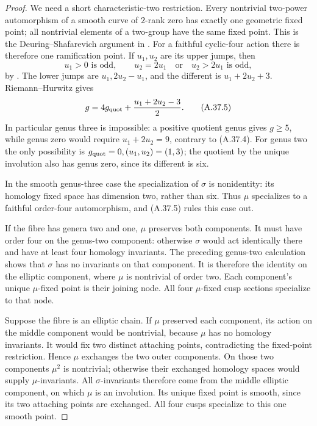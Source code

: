 \begin{proof}
We need a short characteristic-two restriction. Every
nontrivial two-power automorphism of a smooth curve of
\(2\)-rank zero has exactly one geometric fixed point;
all nontrivial elements of a two-group have the same
fixed point. This is the Deuring--Shafarevich argument in
\cite[Lemma 3.2 and Remark 3.1]{fghGiuliettiKorchmaros}.
For a faithful cyclic-four action there is therefore
one ramification point. If \(u_1,u_2\) are its upper
jumps, then
\[
 u_1>0\text{ is odd},\qquad
 u_2=2u_1\quad\text{or}\quad u_2>2u_1\text{ is odd},
                                                               \tag{A.37.4}
\]
by \cite[Theorem 1.1(c)]{fghObusPries}.
The lower jumps are \(u_1,2u_2-u_1\), and the different
is \(u_1+2u_2+3\). Riemann--Hurwitz gives
\[
      g=4g_{\rm quot}+\frac{u_1+2u_2-3}{2}.             \tag{A.37.5}
\]
In particular genus three is impossible: a positive quotient
genus gives \(g\ge5\), while genus zero would require
\(u_1+2u_2=9\), contrary to (A.37.4).
For genus two the only possibility is
\(g_{\rm quot}=0,(u_1,u_2)=(1,3)\); the quotient by
the unique involution also has genus zero, since its
different is six.

In the smooth genus-three case the specialization of
\(\sigma\) is nonidentity: its homology fixed space
has dimension two, rather than six. Thus \(\mu\)
specializes to a faithful order-four automorphism, and
(A.37.5) rules this case out.

If the fibre has genera two and one, \(\mu\) preserves
both components. It must have order four on the genus-two
component: otherwise \(\sigma\) would act identically
there and have at least four homology invariants.
The preceding genus-two calculation shows that
\(\sigma\) has no invariants on that component.
It is therefore the identity on the elliptic component,
where \(\mu\) is nontrivial of order two. Each component's
unique \(\mu\)-fixed point is their joining node.
All four \(\mu\)-fixed cusp sections specialize to that node.

Suppose the fibre is an elliptic chain. If \(\mu\)
preserved each component, its action on the middle
component would be nontrivial, because \(\mu\) has no
homology invariants. It would fix two distinct attaching
points, contradicting the fixed-point restriction.
Hence \(\mu\) exchanges the two outer components.
On those two components \(\mu^2\) is nontrivial;
otherwise their exchanged homology spaces would supply
\(\mu\)-invariants. All \(\sigma\)-invariants therefore
come from the middle elliptic component, on which
\(\mu\) is an involution. Its unique fixed point is
smooth, since its two attaching points are exchanged.
All four cusps specialize to this one smooth point.


\end{proof}
